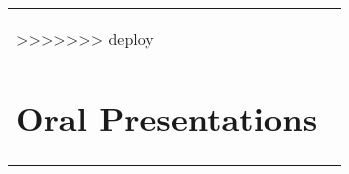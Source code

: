 \documentclass[10pt]{article}
\begin{document}
\begin{table}[H]
\begin{tabular}{p{1.6cm}p{12cm}}
%
>>>>>>> deploy


\section*{Oral Presentations}


\end{tabular}
\end{table}
\end{document}
